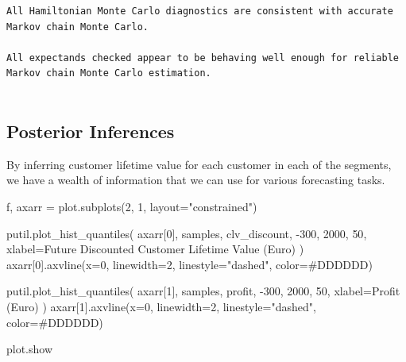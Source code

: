 \documentclass[
  letterpaper,
  DIV=11,
  numbers=noendperiod]{scrartcl}
\newenvironment{Shaded}{\begin{snugshade}}{\end{snugshade}}
\newcommand{\DecValTok}[1]{\textcolor[rgb]{0.68,0.00,0.00}{#1}}
\newcommand{\NormalTok}[1]{\textcolor[rgb]{0.00,0.23,0.31}{#1}}
\newcommand{\OperatorTok}[1]{\textcolor[rgb]{0.37,0.37,0.37}{#1}}
\newcommand{\StringTok}[1]{\textcolor[rgb]{0.13,0.47,0.30}{#1}}
\begin{document}
\begin{verbatim}
All Hamiltonian Monte Carlo diagnostics are consistent with accurate
Markov chain Monte Carlo.
 
All expectands checked appear to be behaving well enough for reliable
Markov chain Monte Carlo estimation.
 
\end{verbatim}

\subsection{Posterior Inferences}\label{posterior-inferences-1}

By inferring customer lifetime value for each customer in each of the
segments, we have a wealth of information that we can use for various
forecasting tasks.

\begin{Shaded}
\begin{Highlighting}[]
\NormalTok{f, axarr }\OperatorTok{=}\NormalTok{ plot.subplots(}\DecValTok{2}\NormalTok{, }\DecValTok{1}\NormalTok{, layout}\OperatorTok{=}\StringTok{"constrained"}\NormalTok{)}

\NormalTok{putil.plot\_hist\_quantiles(}
\NormalTok{  axarr[}\DecValTok{0}\NormalTok{], samples, }\StringTok{\textquotesingle{}clv\_discount\textquotesingle{}}\NormalTok{,}
  \OperatorTok{{-}}\DecValTok{300}\NormalTok{, }\DecValTok{2000}\NormalTok{, }\DecValTok{50}\NormalTok{,}
\NormalTok{  xlabel}\OperatorTok{=}\StringTok{\textquotesingle{}Future Discounted Customer Lifetime Value (Euro)\textquotesingle{}}
\NormalTok{)}
\NormalTok{axarr[}\DecValTok{0}\NormalTok{].axvline(x}\OperatorTok{=}\DecValTok{0}\NormalTok{, linewidth}\OperatorTok{=}\DecValTok{2}\NormalTok{, linestyle}\OperatorTok{=}\StringTok{"dashed"}\NormalTok{,}
\NormalTok{                 color}\OperatorTok{=}\StringTok{\textquotesingle{}\#DDDDDD\textquotesingle{}}\NormalTok{)}

\NormalTok{putil.plot\_hist\_quantiles(}
\NormalTok{  axarr[}\DecValTok{1}\NormalTok{], samples, }\StringTok{\textquotesingle{}profit\textquotesingle{}}\NormalTok{,}
  \OperatorTok{{-}}\DecValTok{300}\NormalTok{, }\DecValTok{2000}\NormalTok{, }\DecValTok{50}\NormalTok{,}
\NormalTok{  xlabel}\OperatorTok{=}\StringTok{\textquotesingle{}Profit (Euro)\textquotesingle{}}
\NormalTok{)}
\NormalTok{axarr[}\DecValTok{1}\NormalTok{].axvline(x}\OperatorTok{=}\DecValTok{0}\NormalTok{, linewidth}\OperatorTok{=}\DecValTok{2}\NormalTok{, linestyle}\OperatorTok{=}\StringTok{"dashed"}\NormalTok{,}
\NormalTok{                 color}\OperatorTok{=}\StringTok{\textquotesingle{}\#DDDDDD\textquotesingle{}}\NormalTok{)}

\NormalTok{plot.show}
\end{Highlighting}
\end{Shaded}
\end{document}
